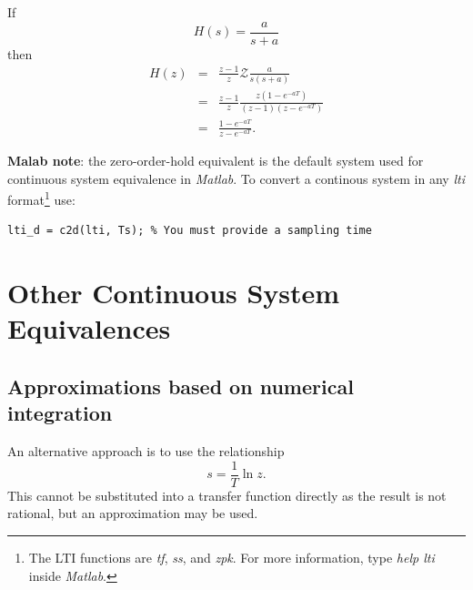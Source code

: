 \begin{slide}\label{slide:l11s10}
\end{slide}

\begin{slide}\label{slide:l11s11}
  If \[H(s) = \frac{a}{s+a}\] then
  \begin{eqnarray*}
    H(z) &=& \frac{z-1}{z}\mathcal{Z} \frac{a}{s(s+a)}\\
         &=& \frac{z-1}{z} \frac{z(1-e^{-aT})}{(z-1)(z-e^{-aT})}\\
         &=& \frac{1-e^{-aT}}{z-e^{-aT}}.
  \end{eqnarray*}
\end{slide}

\textbf{Malab note}: the zero-order-hold equivalent is the default 
system used for continuous system equivalence in \emph{Matlab}. To 
convert a continous system in any \emph{lti} format\footnote{%
The LTI functions are \emph{tf}, \emph{ss}, and \emph{zpk}. For more
information, type \emph{help lti} inside \emph{Matlab}.} use:
\begin{verbatim}
lti_d = c2d(lti, Ts); % You must provide a sampling time
\end{verbatim} 

\section*{Other Continuous System Equivalences}

\subsection*{Approximations based on numerical integration}

An alternative approach is to use the relationship \[ s  = \frac{1}{T}
\ln z. \] This cannot be substituted into a transfer function directly
as the result is not rational, but an approximation may be used. 

